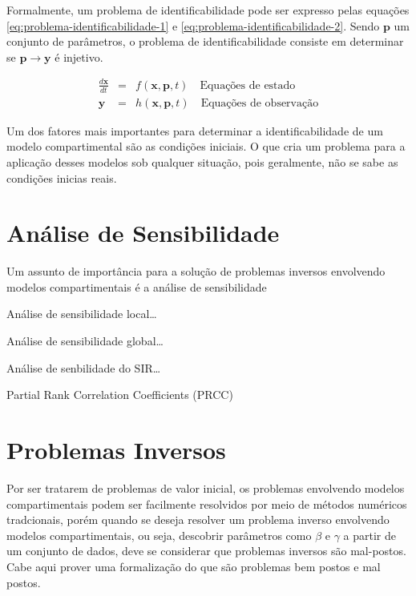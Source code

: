 
Formalmente, um problema de identificabilidade pode ser expresso pelas equações
\ref{eq:problema-identificabilidade-1} e \ref{eq:problema-identificabilidade-2}.
Sendo $\mathbf{p}$ um conjunto de parâmetros, o problema de identificabilidade
consiste em determinar se $\mathbf{p} \rightarrow \mathbf{y}$ é injetivo. 

\begin{eqnarray}
\frac{d\mathbf{x}}{dt} &=& f(\mathbf{x}, \mathbf{p}, t) \quad \text{Equações de estado} \label{eq:problema-identificabilidade-1}\\
\mathbf{y} &=& h(\mathbf{x}, \mathbf{p}, t) \quad \text{Equações de observação} \label{eq:problema-identificabilidade-2}
\end{eqnarray}

Um dos fatores mais importantes para determinar a identificabilidade de um modelo
compartimental são as condições iniciais. O que cria um problema para a aplicação
desses modelos sob qualquer situação, pois geralmente, não se sabe as condições
inicias reais.

\section{Análise de Sensibilidade}

Um assunto de importância para a solução de problemas inversos envolvendo modelos 
compartimentais é a análise de sensibilidade

Análise de sensibilidade local\dots

Análise de sensibilidade global\dots

Análise de senbilidade do SIR\dots

Partial Rank Correlation Coefficients (PRCC)

\section{Problemas Inversos}

Por ser tratarem de problemas de valor inicial, os problemas envolvendo modelos 
compartimentais podem ser facilmente resolvidos por meio de métodos numéricos 
tradcionais, porém quando se deseja resolver um problema inverso envolvendo modelos
compartimentais, ou seja, descobrir parâmetros como $\beta$ e $\gamma$ a partir
de um conjunto de dados, deve se considerar que problemas inversos são mal-postos.
Cabe aqui prover uma formalização do que são problemas bem postos e mal postos.

